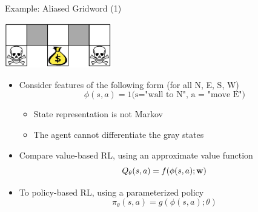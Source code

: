 \documentclass[aspectratio=169]{../latex_main/tntbeamer}  %
\begin{document}
\begin{frame}[c]{Example: Aliased Gridword (1)}
	
	\vspace{-1.6em}
	\begin{center}
		\includegraphics[width=0.35\textwidth]{images/gridworld1.png}
	\end{center}
	
	\begin{itemize}
		\item Consider features of the following form (for all N, E, S, W)
		$$\phi(s,a) = 1\text{(s="wall to N", a = "move E")}$$
		\vspace{-1em}
		\begin{itemize}
			\item State representation is not Markov
			\item The agent \alert{cannot} differentiate the gray states
		\end{itemize}
		\item Compare value-based RL, using an approximate value function
		$$Q_\theta (s,a) = f(\phi(s,a); \mathbf{w})$$
		\item To policy-based RL, using a parameterized policy
		$$\pi_\theta(s,a) = g(\phi(s,a); \theta) $$ 
	\end{itemize}
	
\end{frame}
\end{document}
